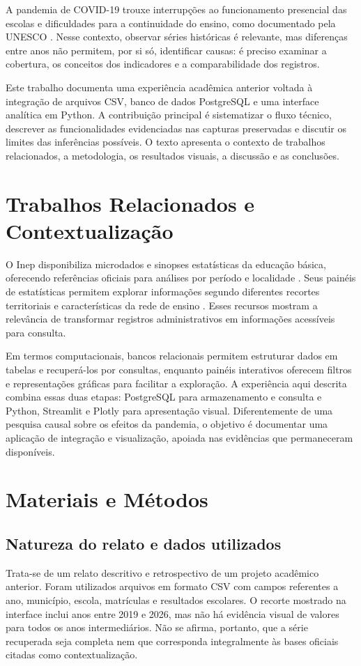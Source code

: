 \documentclass[preprint,10pt,5p]{elsarticle}
\begin{document}
A pandemia de COVID-19 trouxe interrupções ao funcionamento presencial das escolas e dificuldades para a continuidade do ensino, como documentado pela UNESCO \citep{unesco_pandemia}. Nesse contexto, observar séries históricas é relevante, mas diferenças entre anos não permitem, por si só, identificar causas: é preciso examinar a cobertura, os conceitos dos indicadores e a comparabilidade dos registros.

Este trabalho documenta uma experiência acadêmica anterior voltada à integração de arquivos CSV, banco de dados PostgreSQL e uma interface analítica em Python. A contribuição principal é sistematizar o fluxo técnico, descrever as funcionalidades evidenciadas nas capturas preservadas e discutir os limites das inferências possíveis. O texto apresenta o contexto de trabalhos relacionados, a metodologia, os resultados visuais, a discussão e as conclusões.

\section{Trabalhos Relacionados e Contextualização}
O Inep disponibiliza microdados e sinopses estatísticas da educação básica, oferecendo referências oficiais para análises por período e localidade \citep{inep_microdados,inep_sinopses}. Seus painéis de estatísticas permitem explorar informações segundo diferentes recortes territoriais e características da rede de ensino \citep{inep_paineis}. Esses recursos mostram a relevância de transformar registros administrativos em informações acessíveis para consulta.

Em termos computacionais, bancos relacionais permitem estruturar dados em tabelas e recuperá-los por consultas, enquanto painéis interativos oferecem filtros e representações gráficas para facilitar a exploração. A experiência aqui descrita combina essas duas etapas: PostgreSQL para armazenamento e consulta e Python, Streamlit e Plotly para apresentação visual. Diferentemente de uma pesquisa causal sobre os efeitos da pandemia, o objetivo é documentar uma aplicação de integração e visualização, apoiada nas evidências que permaneceram disponíveis.

\section{Materiais e Métodos}
\subsection{Natureza do relato e dados utilizados}
Trata-se de um relato descritivo e retrospectivo de um projeto acadêmico anterior. Foram utilizados arquivos em formato CSV com campos referentes a ano, município, escola, matrículas e resultados escolares. O recorte mostrado na interface inclui anos entre 2019 e 2026, mas não há evidência visual de valores para todos os anos intermediários. Não se afirma, portanto, que a série recuperada seja completa nem que corresponda integralmente às bases oficiais citadas como contextualização.
\end{document}
